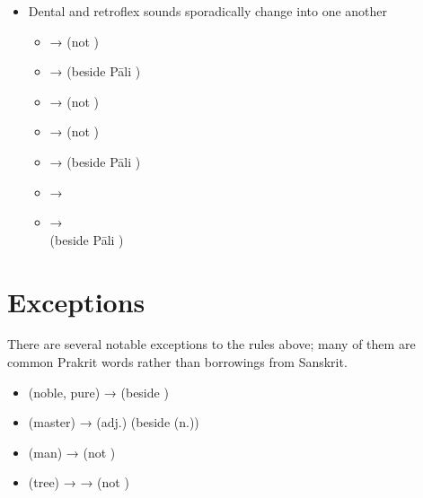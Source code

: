 \begin{itemize}
\begin{itemize}
			\item {} → 
		\end{itemize}
	\item Dental and retroflex sounds sporadically change into one another
		\begin{itemize}
			\item {} →  (not )
			\item {} →  (beside Pāli )
			\item {} →  (not )
			\item {} →  (not )
			\item {} →  (beside Pāli )
			\item {}→ 
			\item {} →  \\(beside Pāli )
		\end{itemize}
\end{itemize}

\section{Exceptions}

There are several notable exceptions to the rules above; many of them are common Prakrit words rather than borrowings from Sanskrit.

\begin{itemize}
	\item {} (noble, pure) →  (beside )
	\item {} (master) →  (adj.) (beside  (n.))
	\item {} (man) →  (not )
	\item {} (tree) →  →  (not )
\end{itemize}

